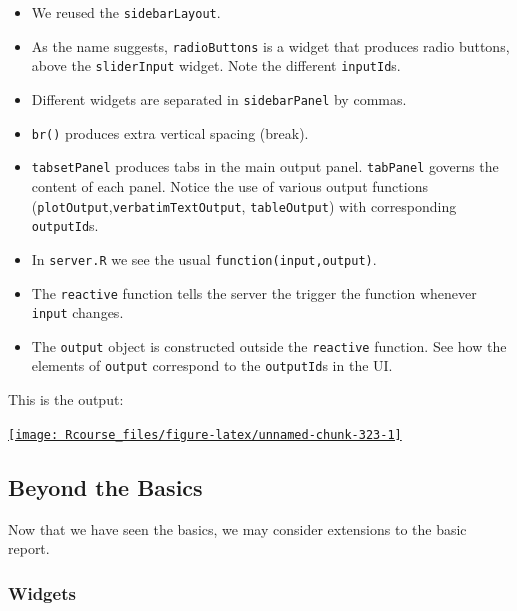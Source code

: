 \documentclass[]{book}
\providecommand{\tightlist}{%
  \setlength{\itemsep}{0pt}\setlength{\parskip}{0pt}}
\theoremstyle{definition}
\theoremstyle{definition}
\theoremstyle{definition}
\theoremstyle{remark}
\begin{document}
\begin{itemize}
\tightlist
\item
  We reused the \texttt{sidebarLayout}.
\item
  As the name suggests, \texttt{radioButtons} is a widget that produces
  radio buttons, above the \texttt{sliderInput} widget. Note the
  different \texttt{inputId}s.
\item
  Different widgets are separated in \texttt{sidebarPanel} by commas.
\item
  \texttt{br()} produces extra vertical spacing (break).
\item
  \texttt{tabsetPanel} produces tabs in the main output panel.
  \texttt{tabPanel} governs the content of each panel. Notice the use of
  various output functions
  (\texttt{plotOutput},\texttt{verbatimTextOutput},
  \texttt{tableOutput}) with corresponding \texttt{outputId}s.
\item
  In \texttt{server.R} we see the usual \texttt{function(input,output)}.
\item
  The \texttt{reactive} function tells the server the trigger the
  function whenever \texttt{input} changes.
\item
  The \texttt{output} object is constructed outside the
  \texttt{reactive} function. See how the elements of \texttt{output}
  correspond to the \texttt{outputId}s in the UI.
\end{itemize}

This is the output:

\href{https://shiny.rstudio.com/gallery/tabsets.html}{\texttt{[image: Rcourse\_files/figure-latex/unnamed-chunk-323-1]} }

\subsection{Beyond the Basics}\label{beyond-the-basics}

Now that we have seen the basics, we may consider extensions to the
basic report.

\subsubsection{Widgets}\label{widgets}
\end{document}

